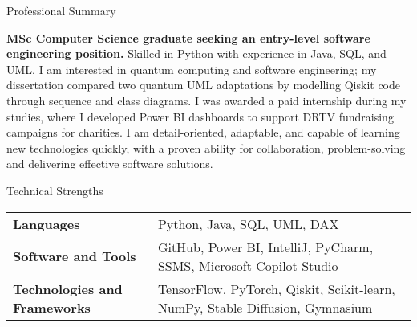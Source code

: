 \documentclass[
	11pt, %
]{resume} %
\begin{document}

\begin{rSection}{Professional Summary}

\textbf{MSc Computer Science graduate seeking an entry-level software engineering position.} Skilled in Python with experience in Java, SQL, and UML. I am interested in quantum computing and software engineering; my dissertation compared two quantum UML adaptations by modelling Qiskit code through sequence and class diagrams. I was awarded a paid internship during my studies, where I developed Power BI dashboards to support DRTV fundraising campaigns for charities. I am detail-oriented, adaptable, and capable of learning new technologies quickly, with a proven ability for collaboration, problem-solving and delivering effective software solutions.

\end{rSection}



\begin{rSection}{Technical Strengths}

    \begin{tabular}{@{} p{4cm} p{11cm} @{}}
        \textbf{Languages} & Python, Java, SQL, UML, DAX \\ 
        \textbf{Software and Tools} & GitHub, Power BI, IntelliJ, PyCharm, SSMS, Microsoft Copilot Studio \\ 
        \textbf{Technologies and Frameworks} & TensorFlow, PyTorch, Qiskit, Scikit-learn, NumPy, Stable Diffusion, Gymnasium\\
    \end{tabular}

\end{rSection}



\end{document}
